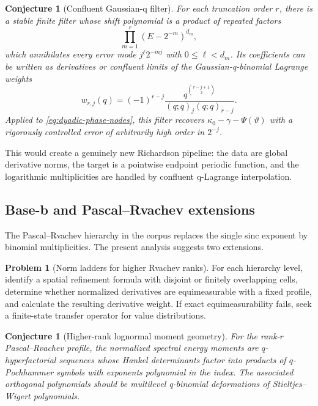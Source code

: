 \documentclass[11pt,oneside]{article}
\numberwithin{equation}{section}
\theoremstyle{plain}
\newtheorem{conjecture}[theorem]{Conjecture}
\theoremstyle{definition}
\newtheorem{problem}[theorem]{Problem}
\theoremstyle{remark}
\begin{document}
\begin{conjecture}[Confluent Gaussian-q filter]
\label{conj:confluent-q-filter}
For each truncation order $r$, there is a stable finite filter whose shift polynomial is a
product of repeated factors
\begin{equation}
 \prod_{m=1}^{r}(E-2^{-m})^{d_m},
 \label{eq:confluent-shift-polynomial}
\end{equation}
which annihilates every error mode $j^\ell2^{-mj}$ with
$0\leq\ell<d_m$.  Its coefficients can be written as derivatives or confluent limits of the
Gaussian-q-binomial Lagrange weights
\begin{equation}
 w_{r,j}(q)=(-1)^{r-j}
 \frac{q^{\binom{r-j+1}{2}}}{(q;q)_j(q;q)_{r-j}}.
 \label{eq:q-Richardson-weights}
\end{equation}
Applied to \eqref{eq:dyadic-phase-nodes}, this filter recovers
$\kappa_0-\gamma-\Psi(\vartheta)$ with a rigorously controlled error of arbitrarily high
order in $2^{-j}$.
\end{conjecture}

This would create a genuinely new Richardson pipeline: the data are global derivative norms,
the target is a pointwise endpoint periodic function, and the logarithmic multiplicities are
handled by confluent q-Lagrange interpolation.

\subsection{Base-b and Pascal--Rvachev extensions}

The Pascal--Rvachev hierarchy in the corpus replaces the single sinc exponent by binomial
multiplicities.  The present analysis suggests two extensions.

\begin{problem}[Norm ladders for higher Rvachev ranks]
For each hierarchy level, identify a spatial refinement formula with disjoint or finitely
overlapping cells, determine whether normalized derivatives are equimeasurable with a fixed
profile, and calculate the resulting derivative weight.  If exact equimeasurability fails,
seek a finite-state transfer operator for value distributions.
\end{problem}

\begin{conjecture}[Higher-rank lognormal moment geometry]
For the rank-$r$ Pascal--Rvachev profile, the normalized spectral energy moments are
$q$-hyperfactorial sequences whose Hankel determinants factor into products of
$q$-Pochhammer symbols with exponents polynomial in the index.  The associated orthogonal
polynomials should be multilevel q-binomial deformations of Stieltjes--Wigert polynomials.
\end{conjecture}
\end{document}
